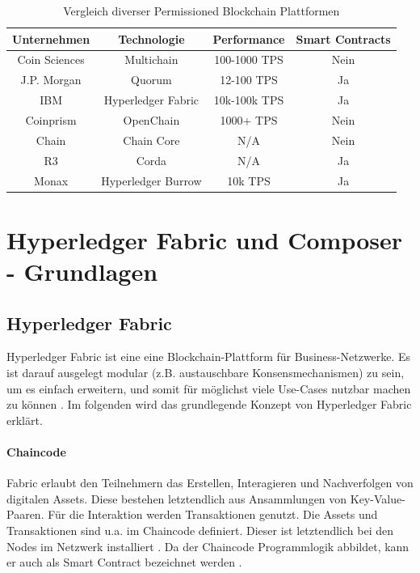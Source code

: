 \begin{table}[h]
    \centering
	\begin{tabular}{c c c c}
	\textbf{Unternehmen} & \textbf{Technologie}  & \textbf{Performance} & \textbf{Smart Contracts} \\ \hline
	Coin Sciences & Multichain & 100-1000 TPS & Nein \\ \hline
    J.P. Morgan & Quorum & 12-100 TPS & Ja \\ \hline
    IBM & Hyperledger Fabric & 10k-100k TPS & Ja \\ \hline
    Coinprism & OpenChain & 1000+ TPS & Nein \\ \hline
    Chain & Chain Core & N/A & Nein \\ \hline
    R3 & Corda & N/A & Ja \\ \hline
    Monax & Hyperledger Burrow & 10k TPS & Ja \\
    \end{tabular}
    \caption{Vergleich diverser Permissioned Blockchain Plattformen \cite{BenHamidaBlockchainEnterpriseOverview2017}\cite{HyperledgerBurrowTeamHyperledgerBurrowGitHub2018}}
	\label{tab:perm-comparison}
\end{table}


\label{sec:hyperledger-fabric-composer}
\section{Hyperledger Fabric und Composer - Grundlagen}

\subsection{Hyperledger Fabric}
Hyperledger Fabric ist eine eine Blockchain-Plattform für Business-Netzwerke. Es ist darauf ausgelegt modular (z.B. austauschbare Konsensmechanismen) zu sein, um es einfach erweitern, und somit für möglichst viele Use-Cases nutzbar machen zu können \cite{HyperledgerFabricTeamHyperledgerWhitepaper2016}. Im folgenden wird das grundlegende Konzept von Hyperledger Fabric erklärt.

\paragraph{Chaincode}
Fabric erlaubt den Teilnehmern das Erstellen, Interagieren und Nachverfolgen von digitalen Assets. Diese bestehen letztendlich aus Ansammlungen von Key-Value-Paaren. Für die Interaktion werden Transaktionen genutzt. Die Assets und Transaktionen sind u.a. im Chaincode definiert. Dieser ist letztendlich bei den Nodes im Netzwerk installiert \cite{SchererPerformanceScalabilityBlockchain2017}. Da der Chaincode Programmlogik abbildet, kann er auch als Smart Contract bezeichnet werden \cite{HyperledgerFabricTeamChaincodeHyperledgerFabric}.

